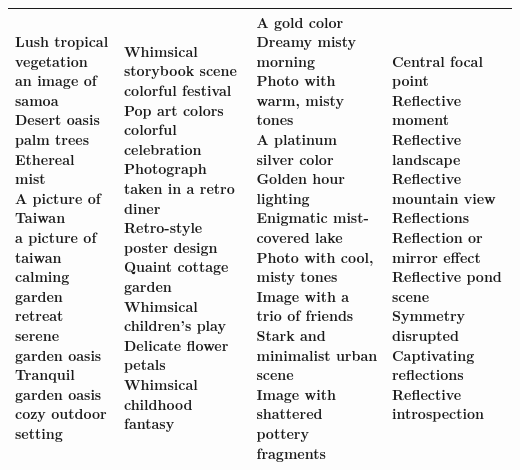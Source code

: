 \documentclass{article}
\begin{document}
\begin{table}[htbp]
\begin{tabular}{|p{4.0cm}|p{4.0cm}|p{4.0cm}|p{4.0cm}|}
\hline
\makecell[t]{Lush tropical vegetation \\ an image of samoa \\ Desert oasis palm trees \\ Ethereal mist \\ A picture of Taiwan \\ a picture of taiwan \\ calming garden retreat \\ serene garden oasis \\ Tranquil garden oasis \\ cozy outdoor setting} & \makecell[t]{Whimsical storybook scene \\ colorful festival \\ Pop art colors \\ colorful celebration \\ Photograph taken in a retro diner \\ Retro-style poster design \\ Quaint cottage garden \\ Whimsical children's play \\ Delicate flower petals \\ Whimsical childhood fantasy} & \makecell[t]{A gold color \\ Dreamy misty morning \\ Photo with warm, misty tones \\ A platinum silver color \\ Golden hour lighting \\ Enigmatic mist-covered lake \\ Photo with cool, misty tones \\ Image with a trio of friends \\ Stark and minimalist urban scene \\ Image with shattered pottery fragments} & \makecell[t]{Central focal point \\ Reflective  moment \\ Reflective  landscape \\ Reflective  mountain view \\ Reflections \\ Reflection or mirror effect \\ Reflective pond scene \\ Symmetry disrupted \\ Captivating reflections \\ Reflective  introspection} \\
\hline

\end{tabular}
\end{table}
\end{document}
